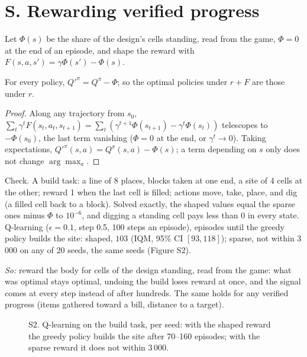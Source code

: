 \section*{S. Rewarding verified progress}
Let $\Phi(s)$ be the share of the design's cells standing, read from the game, $\Phi=0$ at the end of an episode, and
shape the reward with $F(s,a,s')=\gamma\Phi(s')-\Phi(s)$.
\begin{theorem} For every policy, $Q'^{\pi}=Q^\pi-\Phi$; so the optimal policies under $r+F$
are those under $r$.\end{theorem}
\begin{proof} Along any trajectory from $s_0$, $\sum_t\gamma^tF(s_t,a_t,s_{t+1})=\sum_t(\gamma^{t+1}\Phi(s_{t+1})-\gamma^t\Phi(s_t))$
telescopes to $-\Phi(s_0)$, the last term vanishing ($\Phi=0$ at the end, or $\gamma^t\to0$). Taking expectations,
$Q'^\pi(s,a)=Q^\pi(s,a)-\Phi(s)$; a term depending on $s$ only does not change $\arg\max_a$.\end{proof}
\noindent Check. A build task: a line of 8 places, blocks taken at one end, a site of 4 cells at the other; reward 1 when
the last cell is filled; actions move, take, place, and dig (a filled cell back to a block). Solved exactly, the shaped
values equal the sparse ones minus $\Phi$ to $10^{-6}$, and digging a standing cell pays less than 0 in every state.
Q-learning ($\epsilon=0.1$, step 0.5, 100 steps an episode), episodes until the greedy policy builds the site: shaped,
$103$ (IQM, 95\% CI $[93, 118]$); sparse, not within 3\,000 on any of 20 seeds, the same seeds (Figure S2).

\emph{So:} reward the body for cells of the design standing, read from the game: what was optimal stays optimal, undoing
the build loses reward at once, and the signal comes at every step instead of after hundreds. The same holds for any
verified progress (items gathered toward a bill, distance to a target).

\begin{figure}[h]\centering
{}
\caption{S2. Q-learning on the build task, per seed: with the shaped reward the greedy policy builds the site after
70--160 episodes; with the sparse reward it does not within 3\,000.}
\end{figure}
